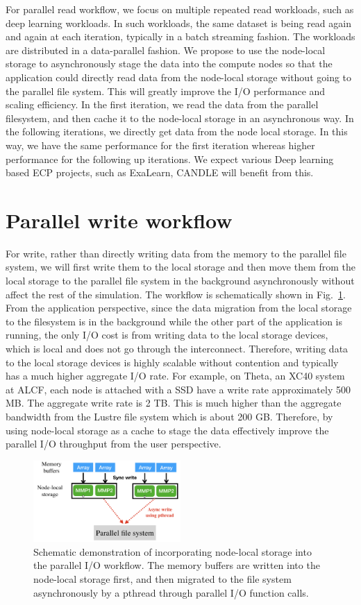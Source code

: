\documentclass[aps, rmp, 11pt, notitlepage]{revtex4-1}
\begin{document}
For parallel read workflow, we focus on multiple repeated read workloads, such as deep learning workloads. In such workloads, the same dataset is being read again and again at each iteration, typically in a batch streaming fashion. The workloads are distributed in a data-parallel fashion. We propose to use the node-local storage to asynchronously stage the data into the compute nodes so that the application could directly read data from the node-local storage without going to the parallel file system. This will greatly improve the I/O performance and scaling efficiency. In the first iteration, we read the data from the parallel filesystem, and then cache it to the node-local storage in an asynchronous way. In the following iterations, we directly get data from the node local storage. In this way, we have the same performance for the first iteration whereas higher performance for the following up iterations. We expect various Deep learning based ECP projects, such as ExaLearn, CANDLE will benefit from this.

\section{Parallel write workflow}
For write, rather than directly writing data from the memory to the parallel file system, we will first write them to the local storage and then move them from the local storage to the parallel file system in the background asynchronously without affect the rest of the simulation. The workflow is schematically shown in Fig.~\ref{fig:schematic}. From the application perspective, since the data migration from the local storage to the filesystem is in the background while the other part of the application is running, the only I/O cost is from writing data to the local storage devices, which is local and does not go through the interconnect. Therefore, writing data to the local storage devices is highly scalable without contention and typically has a much higher aggregate I/O rate. For example, on Theta, an XC40 system at ALCF, each node is attached with a SSD have a write rate approximately 500 MB. The aggregate write rate is 2 TB. This is much higher than the aggregate bandwidth from the Lustre file system which is about 200 GB. Therefore, by using node-local storage as a cache to stage the data effectively improve the parallel I/O throughput from the user perspective. 

\begin{figure}[hbt]
\centering
\includegraphics[width=0.5\textwidth]{schematic.png}
\caption{Schematic demonstration of incorporating node-local storage into the parallel I/O workflow. The memory buffers are written into the node-local storage first, and then migrated to the file system asynchronously by a pthread through parallel I/O function calls.}\label{fig:schematic}
\end{figure} 
\end{document}
